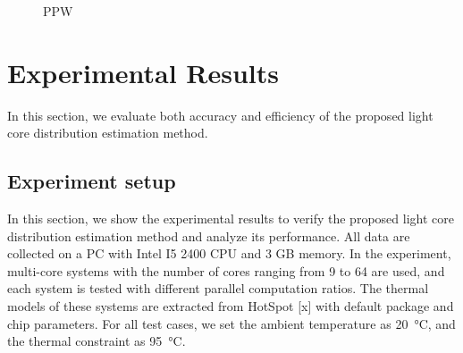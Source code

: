 \begin{figure}[htb]
\centering
{}%
%
\caption{PPW}  
\label{fig:ppw}
\end{figure}


\section{Experimental Results}

In this section, we evaluate both accuracy and efficiency of the proposed light core distribution estimation method.

\subsection{Experiment setup}
In this section, we show the experimental results to verify the proposed light core distribution estimation method and analyze its performance. All data are collected on a PC with Intel I5 2400 CPU and 3 GB memory. In the experiment, multi-core systems with the number of cores ranging from 9 to 64 are used, and each system is tested with different parallel computation ratios. The thermal models of these systems are extracted from HotSpot [x] with default package and chip parameters. For all test cases, we set the ambient temperature as \SI{20}{\degreeCelsius}, and the thermal constraint as \SI{95}{\degreeCelsius}. 

